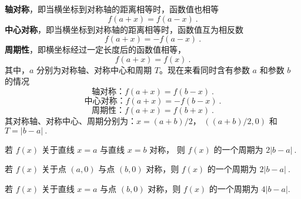 

\textbf{轴对称}，即当横坐标到对称轴的距离相等时，函数值也相等
\begin{equation}
f\left( {a + x} \right) = f\left( {a - x} \right)~.
\end{equation}
\textbf{中心对称}，即当横坐标到对称轴的距离相等时，函数值互为相反数
\begin{equation}
f\left( {a + x} \right) =  - f\left( {a - x} \right)~.
\end{equation}
\textbf{周期性}，即横坐标经过一定长度后的函数值相等，
\begin{equation}
f\left( {a + x} \right) = f\left( x \right)~.
\end{equation}
其中，$a$ 分别为对称轴、对称中心和周期 $T$。现在来看同时含有参数 $a$ 和参数 $b$ 的情况
\begin{equation}
\text{轴对称：} f\left( {a + x} \right) = f\left( {b - x} \right)~.
\end{equation}
\begin{equation}
\text{中心对称：} f\left( {a + x} \right) =  - f\left( {b - x} \right)~.
\end{equation}
\begin{equation}
\text{周期性：} f\left( {a + x} \right) = f\left( {b + x} \right)~.
\end{equation}
其对称轴、对称中心、周期分别为：$x = (a + b)/2$， $((a + b)/2, 0)$ 和 $T = \left| {b - a} \right|~.$

若 $f(x)$ 关于直线 $x=a$ 与直线 $x=b$ 对称， 则 $f(x)$ 的一个周期为 $2\left| {b - a} \right|~.$

若 $f(x)$ 关于点 $(a,0)$ 与点 $(b,0)$ 对称，则 $f(x)$ 的一个周期为 $2\left| {b - a} \right|~.$

若 $f(x)$ 关于直线 $x=a$ 与点 $(b,0)$ 对称，则 $f(x)$ 的一个周期为 $4\left| {b - a} \right|.$
